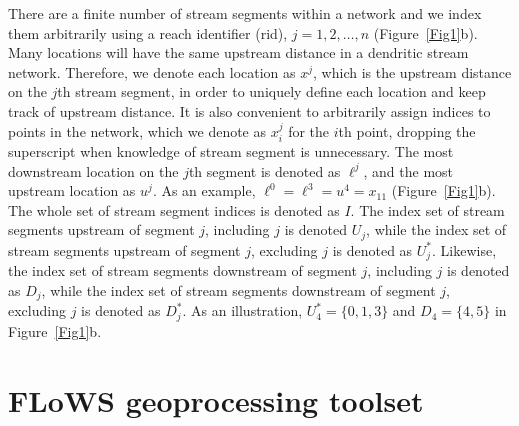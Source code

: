 \documentclass[article]{jss}
\begin{document}
There are a finite number of stream segments within a network and we
index them arbitrarily using a reach identifier (rid), $j = 1, 2,
\ldots, n$ (Figure~\ref{Fig1}b). Many locations will have the same
upstream distance in a dendritic stream network. Therefore, we denote
each location as $x^j$, which is the upstream distance on the $j$th
stream segment, in order to uniquely define each location and keep
track of upstream distance.  It is also convenient to arbitrarily
assign indices to points in the network, which we denote as $x_i^j$
for the $i$th point, dropping the superscript when knowledge of stream
segment is unnecessary. The most downstream location on the $j$th
segment is denoted as $\ell^j$, and the most upstream location as
$u^j$. As an example, $\ell^0 = \ell^3 = u^4 = x_{11}$
(Figure~\ref{Fig1}b). The whole set of stream segment indices is
denoted as $I$. The index set of stream segments upstream of segment
$j$, including  $j$ is denoted $U_j$, while the index set of stream
segments upstream of segment $j$, excluding  $j$ is denoted as
$U_j^*$. Likewise, the index set of stream segments downstream of
segment $j$, including $j$ is denoted as $D_j$,  while the index set of stream segments downstream of segment $j$, excluding $j$ is denoted as $D_j^*$. As an illustration, $U_4^*=\{0,1,3\}$ and $D_4 = \{4,5\}$ in Figure~\ref{Fig1}b.

%
%

\section{FLoWS geoprocessing toolset}
\end{document}
